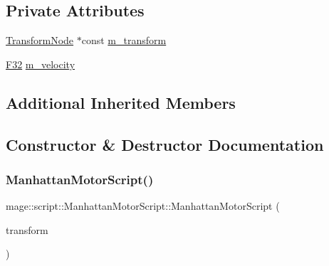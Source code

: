 \subsection*{Private Attributes}
\begin{DoxyCompactItemize}
\item 
\hyperlink{classmage_1_1_transform_node}{Transform\+Node} $\ast$const \hyperlink{classmage_1_1script_1_1_manhattan_motor_script_a4df5fa9ddd41dc83bdc7f2ee5d133fa9}{m\+\_\+transform}
\item 
\hyperlink{namespacemage_aa97e833b45f06d60a0a9c4fc22ae02c0}{F32} \hyperlink{classmage_1_1script_1_1_manhattan_motor_script_a38cdef10269075f08f3fcdc9ed8bc520}{m\+\_\+velocity}
\end{DoxyCompactItemize}
\subsection*{Additional Inherited Members}


\subsection{Constructor \& Destructor Documentation}
\hypertarget{classmage_1_1script_1_1_manhattan_motor_script_a398939e0ba281042f28ce9ca42187624}{}\label{classmage_1_1script_1_1_manhattan_motor_script_a398939e0ba281042f28ce9ca42187624} 
\subsubsection{\texorpdfstring{Manhattan\+Motor\+Script()}{ManhattanMotorScript()}\hspace{0.1cm}{\footnotesize\ttfamily [1/3]}}
{\footnotesize\ttfamily mage\+::script\+::\+Manhattan\+Motor\+Script\+::\+Manhattan\+Motor\+Script (\begin{DoxyParamCaption}\item[{\hyperlink{classmage_1_1_transform_node}{Transform\+Node} $\ast$}]{transform }\end{DoxyParamCaption})\hspace{0.3cm}{\ttfamily [explicit]}}

\hypertarget{classmage_1_1script_1_1_manhattan_motor_script_ae18f69e5dd5c4ffd2c6aa9db01d86024}{}\label{classmage_1_1script_1_1_manhattan_motor_script_ae18f69e5dd5c4ffd2c6aa9db01d86024} 
